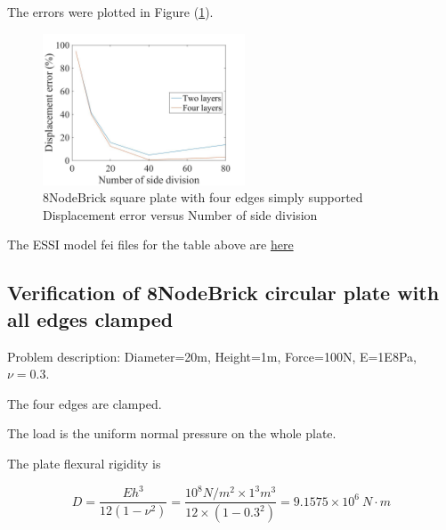 \documentclass[fleqn,11pt]{article}
\begin{document}
The errors were plotted in Figure (\ref{fig 8NodeBrick square plate with four edge simply supported}).
\begin{figure}[H]
    \centering
    \includegraphics[width=6cm]{../Figure-files/error8brick_square_plate_simply_supported.jpeg}
  \captionsetup{justification=centering,margin=3cm}
  \caption{8NodeBrick square plate with four edges simply supported\\
      Displacement error   versus   Number of side division}
  \label{fig 8NodeBrick square plate with four edge simply supported}
\end{figure}


The ESSI model fei files for the table above are \href{https://github.com/yuan-energy/ESSI_Verification/blob/master/8NodeBrick/square_plate_simply_support/square_plate_simply_support.tar.gz?raw=true}{here}

























\newpage
\subsection{Verification of 8NodeBrick circular plate with all edges clamped}

Problem description: Diameter=20m, Height=1m, Force=100N, E=1E8Pa, $\nu=0.3$. 

The four edges are clamped. 

The load is the uniform normal pressure on the whole plate. 


The plate flexural rigidity is 

\begin{equation}
  D=\frac{Eh^3}{12(1-\nu^2)}=\frac{10^8 N/m^2 \times 1^3 m^3 }{12 \times (1-0.3^2) }= 9.1575 \times 10^6 \ N\cdot m
\end{equation}
\end{document}

